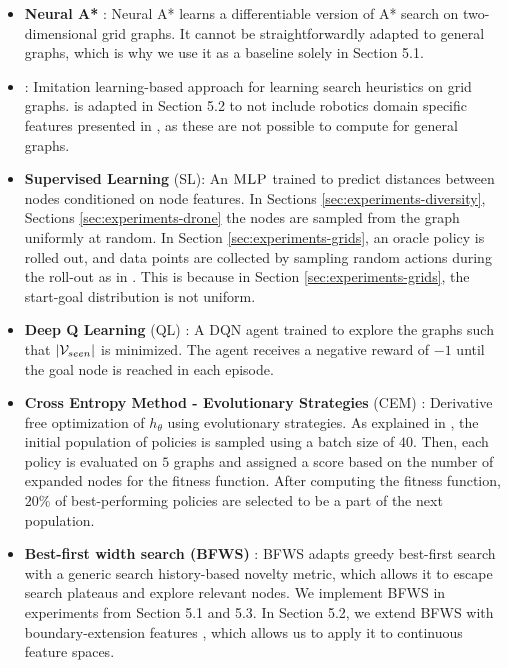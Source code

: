 \begin{itemize}
    \item \textbf{Neural A*} \cite{yonetani2020path}: Neural A* learns a differentiable version of A* search on two-dimensional grid graphs. It cannot be straightforwardly adapted to general graphs, which is why we use it as a baseline solely in Section 5.1.
    
    \item \textbf{\sail} \cite{bhardwaj2017learning}: Imitation learning-based approach for learning search heuristics on grid graphs. \sail is adapted in Section 5.2 to not include robotics domain specific features presented in \cite{bhardwaj2017learning}, as these are not possible to compute for general graphs.
    
    \item \textbf{Supervised Learning} (SL): An $\textsc{MLP}$ trained to predict distances between nodes conditioned on node features. In Sections \ref{sec:experiments-diversity}, Sections \ref{sec:experiments-drone} the nodes are sampled from the graph uniformly at random. In Section \ref{sec:experiments-grids}, an oracle policy is rolled out, and data points are collected by sampling random actions during the roll-out as in \sail. This is because in Section \ref{sec:experiments-grids}, the start-goal distribution is not uniform.
    
    \item \textbf{Deep Q Learning}  (QL) \cite{mnih2013playing}: A DQN agent trained to explore the graphs such that $|\mathcal{V}_{seen}|$ is minimized. The agent receives a negative reward of $-1$ until the goal node is reached in each episode. 
    
    \item \textbf{Cross Entropy Method - Evolutionary Strategies} (CEM) \cite{de2005tutorial}: Derivative free optimization of $h_{\theta}$ using evolutionary strategies. As explained in \cite{bhardwaj2017learning}, the initial population of policies is sampled using a batch size of $40$. Then, each policy is evaluated on $5$ graphs and assigned a score based on the number of expanded nodes for the fitness function. After computing the fitness function, $20\%$ of best-performing policies are selected to be a part of the next population.
    
    \item \textbf{Best-first width search (BFWS)} \cite{lipovetzky2017best}: BFWS adapts greedy best-first search with a generic search history-based novelty metric, which allows it to escape search plateaus and explore relevant nodes. We implement BFWS in experiments from Section 5.1 and 5.3. In Section 5.2, we extend BFWS with boundary-extension features \cite{teichteil2021boundary}, which allows us to apply it to continuous feature spaces. 
    

\end{itemize}
